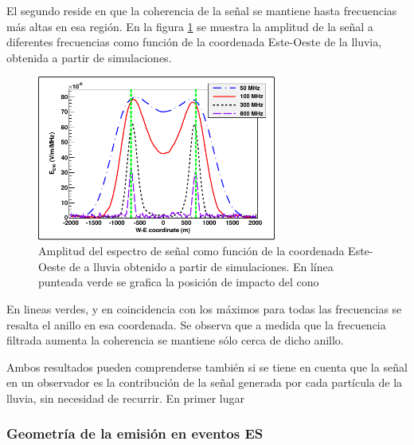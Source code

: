 	El segundo reside en que la coherencia de la señal se mantiene hasta frecuencias más altas en esa región.
	En la figura \ref{fig:chConeSig} se muestra la amplitud de la señal a diferentes frecuencias como función de la coordenada Este-Oeste de la lluvia, obtenida a partir de simulaciones.
	\begin{figure}[ht!]
	\centering
		\includegraphics[width=0.7\textwidth]{fig/EASRadio/chConeSig}
		\caption{\label{fig:chConeSig} Amplitud del espectro de se\~nal como funci\'on de la coordenada Este-Oeste de a lluvia obtenido a partir de simulaciones. En l\'inea punteada verde se grafica la posici\'on de impacto del cono \cher{}}
	\end{figure}
	En lineas verdes, y en coincidencia con los máximos para todas las frecuencias se resalta el anillo \cher{} en esa coordenada.
	Se observa que a medida que la frecuencia filtrada aumenta la coherencia se mantiene sólo cerca de dicho anillo.
	
	Ambos resultados pueden comprenderse tambi\'en si se tiene en cuenta que la señal en un observador es la contribución de la señal generada por cada partícula de la lluvia, sin necesidad de recurrir.
	En primer lugar 
	
	
	\subsubsection{Geometr\'ia de la emisi\'on en eventos ES}
	
